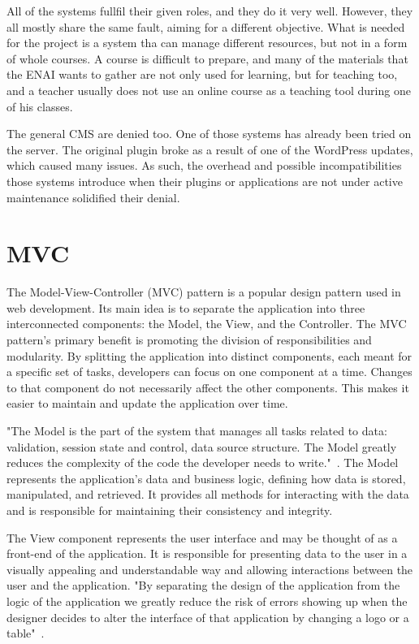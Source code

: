 \documentclass[
  digital,     %
  oneside,     %
  nosansbold,  %
  colorbold, %
  lof,         %
  lot,         %
]{fithesis4}
\begin{document}
All of the systems fullfil their given roles, and they do it very well. However, they all mostly share the same
fault, aiming for a different objective. What is needed for the project is a system tha can manage different
resources, but not in a form of whole courses. A course is difficult to prepare, and many of the materials
that the ENAI wants to gather are not only used for learning, but for teaching too, and a teacher usually
does not use an online course as a teaching tool during one of his classes.

The general CMS are denied too. One of those systems has already been tried on the server. The original
plugin broke as a result of one of the WordPress updates, which caused many issues. As such, the overhead
and possible incompatibilities those systems introduce when their plugins or applications are not under
active maintenance solidified their denial.

\section{MVC}
\label{sect:mvc}

The Model-View-Controller (MVC) pattern is a popular design pattern used in web
development. Its main idea is to separate the application into three interconnected
components: the Model, the View, and the Controller. The MVC pattern's primary
benefit is promoting the division of responsibilities and modularity. By splitting the
application into distinct components, each meant for a specific set of tasks, developers
can focus on one component at a time. Changes to that component do not necessarily
affect the other components. This makes it easier to maintain and update the
application over time.

"The Model is the part of the system that manages all tasks related to data: validation,
session state and control, data source structure. The Model greatly reduces the
complexity of the code the developer needs to write."~\cite{gilmore09}. The Model
represents the application's data and business logic, defining how data is stored,
manipulated, and retrieved. It provides all methods for interacting with the data and
is responsible for maintaining their consistency and integrity.

The View component represents the user interface and may be thought of as a front-end
of the application. It is responsible for presenting data to the user in a visually appealing
and understandable way and allowing interactions between the user and the application.
"By separating the design of the application from the logic of the application we greatly
reduce the risk of errors showing up when the designer decides to alter the interface of
that application by changing a logo or a table"~\cite{gilmore09}.
\end{document}
